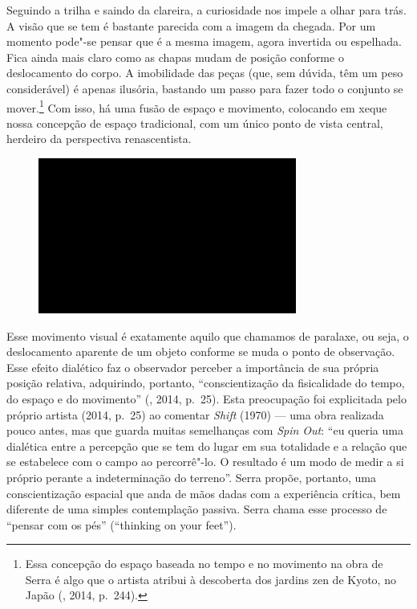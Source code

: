 Seguindo a trilha e saindo da clareira, a curiosidade nos impele a olhar
para trás. A visão que se tem é bastante parecida com a imagem da
chegada. Por um momento pode"-se pensar que é a mesma imagem, agora
invertida ou espelhada. Fica ainda mais claro como as chapas mudam de
posição conforme o deslocamento do corpo. A imobilidade das peças (que,
sem dúvida, têm um peso considerável) é apenas ilusória, bastando um
passo para fazer todo o conjunto se mover.\footnote{Essa concepção do
  espaço baseada no tempo e no movimento na obra de Serra é algo que o
  artista atribui à descoberta dos jardins zen de Kyoto, no Japão
  (, 2014, p.~244).} Com isso, há uma fusão de espaço e movimento,
colocando em xeque nossa concepção de espaço tradicional, com um único
ponto de vista central, herdeiro da perspectiva renascentista.

\begin{figure}[!ht]
\centering
 \includegraphics[width=85mm]{./imgs/im1.jpg}
\caption{\tiny{}}
\end{figure}

Esse movimento visual é exatamente aquilo que chamamos de paralaxe, ou
seja, o deslocamento aparente de um objeto conforme se muda o ponto de
observação. Esse efeito dialético faz o observador perceber a
importância de sua própria posição relativa, adquirindo, portanto,
``conscientização da fisicalidade do tempo, do espaço e do movimento''
(, 2014, p.~25). Esta preocupação foi explicitada pelo próprio
artista (2014, p.~25) ao comentar \emph{Shift} (1970) --- uma obra
realizada pouco antes, mas que guarda muitas semelhanças com \emph{Spin
Out}: ``eu queria uma dialética entre a percepção que se tem do lugar em
sua totalidade e a relação que se estabelece com o campo ao percorrê"-lo.
O resultado é um modo de medir a si próprio perante a indeterminação do
terreno''. Serra propõe, portanto, uma conscientização espacial que anda
de mãos dadas com a experiência crítica, bem diferente de uma simples
contemplação passiva. Serra chama esse processo de ``pensar com os pés''
(``thinking on your feet'').

